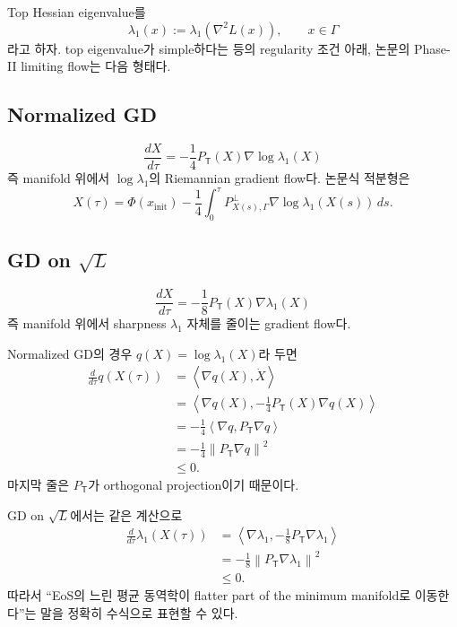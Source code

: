 \documentclass[11pt,a4paper,oneside,openany]{memoir}
\newcommand{\grad}{\nabla}
\newcommand{\Hess}{\nabla^2}
\newcommand{\inner}[2]{\left\langle #1,#2\right\rangle}
\newcommand{\norm}[1]{\left\lVert #1\right\rVert}
\newcommand{\T}{\mathsf{T}}
\theoremstyle{definition}
\begin{document}
Top Hessian eigenvalue를
\begin{equation}
  \lambda_1(x):=\lambda_1(\Hess L(x)),\qquad x\in\Gamma
\end{equation}
라고 하자. top eigenvalue가 simple하다는 등의 regularity 조건 아래,
논문의 Phase-II limiting flow는 다음 형태다.

\subsection{Normalized GD}

\begin{equation}
  \boxed{
  \frac{dX}{d\tau}
  =-\frac14 P_{\T}(X)\grad\log\lambda_1(X)
  }
  \label{eq:ngd-limit-flow}
\end{equation}
즉 manifold 위에서 $\log\lambda_1$의 Riemannian gradient flow다.
논문식 적분형은
\begin{equation}
  X(\tau)=\Phi(x_{\mathrm{init}})
  -\frac14\int_0^\tau
  P^{\perp}_{X(s),\Gamma}\grad\log\lambda_1(X(s))\,ds.
\end{equation}

\subsection{GD on \texorpdfstring{$\sqrt L$}{sqrt(L)}}

\begin{equation}
  \boxed{
  \frac{dX}{d\tau}
  =-\frac18 P_{\T}(X)\grad\lambda_1(X)
  }
  \label{eq:sqrt-limit-flow}
\end{equation}
즉 manifold 위에서 sharpness $\lambda_1$ 자체를 줄이는 gradient flow다.

\begin{suppbox}
Normalized GD의 경우 $q(X)=\log\lambda_1(X)$라 두면
\begin{align}
  \frac{d}{d\tau}q(X(\tau))
  &=\inner{\grad q(X)}{\dot X}\\
  &=\inner{\grad q(X)}{-\tfrac14P_{\T}(X)\grad q(X)}\\
  &=-\frac14\inner{\grad q}{P_{\T}\grad q}\\
  &=-\frac14\norm{P_{\T}\grad q}^2\\
  &\le0.
\end{align}
마지막 줄은 $P_{\T}$가 orthogonal projection이기 때문이다.

GD on $\sqrt L$에서는 같은 계산으로
\begin{align}
  \frac{d}{d\tau}\lambda_1(X(\tau))
  &=\inner{\grad\lambda_1}{-\tfrac18P_{\T}\grad\lambda_1}\\
  &=-\frac18\norm{P_{\T}\grad\lambda_1}^2\\
  &\le0.
\end{align}
따라서 ``EoS의 느린 평균 동역학이 flatter part of the minimum manifold로 이동한다''는 말을
정확히 수식으로 표현할 수 있다.
\end{suppbox}
\end{document}
